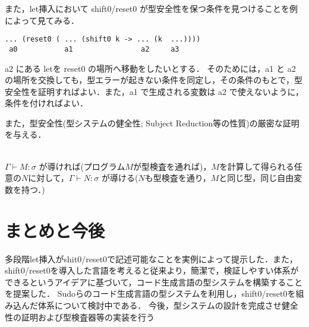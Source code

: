 \documentclass[10pt,a4j,xcolor=dvipsnames,twocolumn]{jarticle}
\theoremstyle{definition}
\begin{document}

また，let挿入において shift0/reset0 が型安全性を保つ条件を見つけることを例によって見てみる．

\begin{lstlisting}
... (reset0 ( ... (shift0 k -> ... (k  ...))))
 a0           a1                a2     a3
\end{lstlisting}

a2 にある letを reset0 の場所へ移動をしたいとする．
そのためには，a1 と a2 の場所を交換しても，型エラーが起きない条件を同定し，その条件のもとで，型安全性を証明すればよい．また，a1 で生成される変数は a2 で使えないように，条件を付ければよい．


また，型安全性(型システムの健全性; Subject Reduction等の性質)の厳密な証明を与える．

\\
$\Gamma \vdash M: \sigma$ が導ければ(プログラム$M$が型検査を通れば)，$M$を計算して得られる任意の$N$に対して，$\Gamma \vdash N: \sigma$ が導ける($N$も型検査を通り，$M$と同じ型，同じ自由変数を持つ．)

\section{まとめと今後}
多段階let挿入がshit0/reset0で記述可能なことを実例によって提示した．また，shift0/reset0を導入した言語を考えると従来より，簡潔で，検証しやすい体系ができるというアイデアに基づいて，コード生成言語の型システムを構築することを提案した．
Sudoらのコード生成言語の型システム\cite{Sudo2014}を利用し，shift0/reset0を組み込んだ体系について検討中である．
今後，型システムの設計を完成させ健全性の証明および型検査器等の実装を行う



\end{document}
